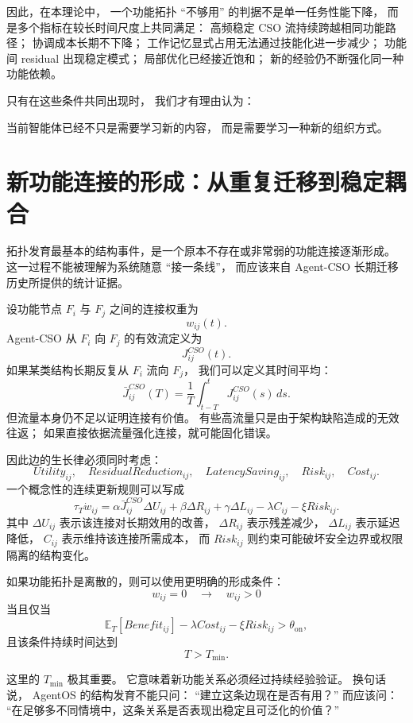因此，在本理论中，
一个功能拓扑 ``不够用'' 的判据不是单一任务性能下降，
而是多个指标在较长时间尺度上共同满足：
高频稳定 CSO 流持续跨越相同功能路径；
协调成本长期不下降；
工作记忆显式占用无法通过技能化进一步减少；
功能间 residual 出现稳定模式；
局部优化已经接近饱和；
新的经验仍不断强化同一种功能依赖。

只有在这些条件共同出现时，
我们才有理由认为：
\begin{statementbox}
当前智能体已经不只是需要学习新的内容，
而是需要学习一种新的组织方式。
\end{statementbox}

\section{新功能连接的形成：从重复迁移到稳定耦合}

拓扑发育最基本的结构事件，是一个原本不存在或非常弱的功能连接逐渐形成。
这一过程不能被理解为系统随意 ``接一条线''，
而应该来自 Agent-CSO 长期迁移历史所提供的统计证据。

设功能节点 $F_i$ 与 $F_j$ 之间的连接权重为
\[
w_{ij}(t).
\]
Agent-CSO 从 $F_i$ 向 $F_j$ 的有效流定义为
\[
J_{ij}^{CSO}(t).
\]
如果某类结构长期反复从 $F_i$ 流向 $F_j$，
我们可以定义其时间平均：
\[
\bar J_{ij}^{CSO}(T)
=
\frac{1}{T}
\int_{t-T}^{t}
J_{ij}^{CSO}(s)\,ds.
\]
但流量本身仍不足以证明连接有价值。
有些高流量只是由于架构缺陷造成的无效往返；
如果直接依据流量强化连接，就可能固化错误。

因此边的生长律必须同时考虑：
\[
Utility_{ij},
\quad
ResidualReduction_{ij},
\quad
LatencySaving_{ij},
\quad
Risk_{ij},
\quad
Cost_{ij}.
\]
一个概念性的连续更新规则可以写成
\[
\tau_T\dot w_{ij}
=
\alpha
\bar J_{ij}^{CSO}
\Delta U_{ij}
+
\beta
\Delta R_{ij}
+
\gamma
\Delta L_{ij}
-
\lambda
C_{ij}
-
\xi
Risk_{ij}.
\]
其中 $\Delta U_{ij}$ 表示该连接对长期效用的改善，
$\Delta R_{ij}$ 表示残差减少，
$\Delta L_{ij}$ 表示延迟降低，
$C_{ij}$ 表示维持该连接所需成本，
而 $Risk_{ij}$ 则约束可能破坏安全边界或权限隔离的结构变化。

如果功能拓扑是离散的，则可以使用更明确的形成条件：
\[
w_{ij}=0
\quad\longrightarrow\quad
w_{ij}>0
\]
当且仅当
\[
\mathbb E_T
\left[
Benefit_{ij}
\right]
-
\lambda Cost_{ij}
-
\xi Risk_{ij}
>
\theta_{\mathrm{on}},
\]
且该条件持续时间达到
\[
T>T_{\min}.
\]

这里的 $T_{\min}$ 极其重要。
它意味着新功能关系必须经过持续经验验证。
换句话说，
AgentOS 的结构发育不能只问：
``建立这条边现在是否有用？''
而应该问：
``在足够多不同情境中，这条关系是否表现出稳定且可泛化的价值？''

